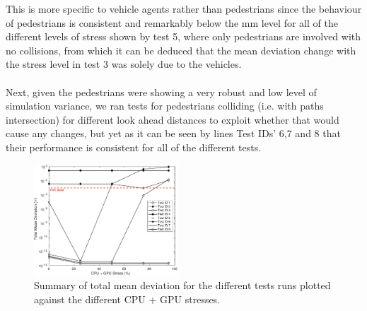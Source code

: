 This is more specific to vehicle agents rather than pedestrians since the behaviour of pedestrians is consistent and remarkably below the mm level for all of the different levels of stress shown by test 5, where only pedestrians are involved with no collisions, from which it can be deduced that the mean deviation change with the stress level in test 3 was solely due to the vehicles. \\\\
Next, given the pedestrians were showing a very robust and low level of simulation variance, we ran tests for pedestrians colliding (i.e. with paths intersection) for different look ahead distances to exploit whether that would cause any changes, but yet as it can be seen by lines Test IDs' 6,7 and 8 that their performance is consistent for all of the different tests.

\begin{figure}[h]
    \centering
    \includegraphics[width=0.48\textwidth]{Other/Figures/ExperimentsStressSummary.pdf}
    \caption{Summary of total mean deviation for the different tests runs plotted against the different CPU + GPU stresses.}

    \label{ExperimentsStressSummary}
\end{figure}

